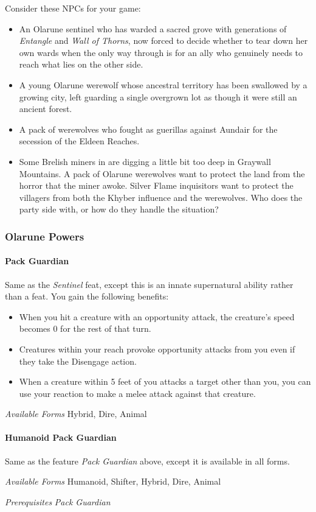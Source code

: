 \documentclass[twocolumn]{dndbook}
\begin{document}
Consider these NPCs for your game:
\begin{itemize}
    \item An Olarune sentinel who has warded a sacred grove with generations of \emph{Entangle} and \emph{Wall of Thorns}, now forced to decide whether to tear down her own wards when the only way through is for an ally who genuinely needs to reach what lies on the other side.
    \item A young Olarune werewolf whose ancestral territory has been swallowed by a growing city, left guarding a single overgrown lot as though it were still an ancient forest.
    \item A pack of werewolves who fought as guerillas against Aundair for the secession of the Eldeen Reaches.
    \item Some Brelish miners in are digging a little bit too deep in Graywall Mountains. A pack of Olarune werewolves want to protect the land from the horror that the miner awoke. Silver Flame inquisitors want to protect the villagers from both the Khyber influence and the werewolves. Who does the party side with, or how do they handle the situation?
\end{itemize}


\subsubsection{Olarune Powers}

\paragraph*{Pack Guardian}
Same as the \emph{Sentinel} feat, except this is an innate supernatural ability rather than a feat.
You gain the following benefits:
\begin{itemize}
    \item When you hit a creature with an opportunity attack, the creature's speed becomes 0 for the rest of that turn.
    \item Creatures within your reach provoke opportunity attacks from you even if they take the Disengage action.
    \item When a creature within 5 feet of you attacks a target other than you, you can use your reaction to make a melee attack against that creature.
\end{itemize}
\emph{Available Forms} Hybrid, Dire, Animal\par

\paragraph*{Humanoid Pack Guardian}
Same as the feature \emph{Pack Guardian} above, except it is available in all forms.\par
\emph{Available Forms} Humanoid, Shifter, Hybrid, Dire, Animal\par
\emph{Prerequisites} \emph{Pack Guardian}\par
\end{document}
